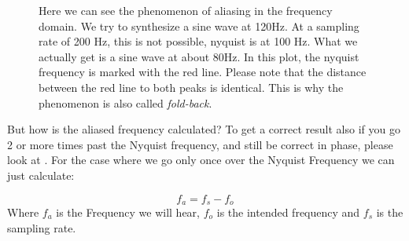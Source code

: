 \begin{figure}[H]
	\begin{center}
		
		\caption[Aliasing in the Frequency Domain]
		{Here we can see the phenomenon of aliasing in the frequency domain. We try to synthesize a sine wave at 120Hz. At a sampling rate of 200 Hz, this is not possible, nyquist is at 100 Hz. What we actually get is a sine wave at about 80Hz. In this plot, the nyquist frequency is marked with the red line. Please note that the distance between the red line to both peaks is identical. This is why the phenomenon is also called \textit{fold-back}.}
		\label{fig:aliasingFreqDomain}
	\end{center}
\end{figure}


But how is the aliased frequency calculated? To get a correct result also if you go 2 or more times past the Nyquist frequency, and still be correct in phase, please look at . For the case where we go only once over the Nyquist Frequency we can just calculate:

\begin{equation}
	f_a = f_s-f_o
\end{equation}
Where $f_a$ is the Frequency we will hear, $f_o$ is the intended frequency and $f_s$ is the sampling rate. 

